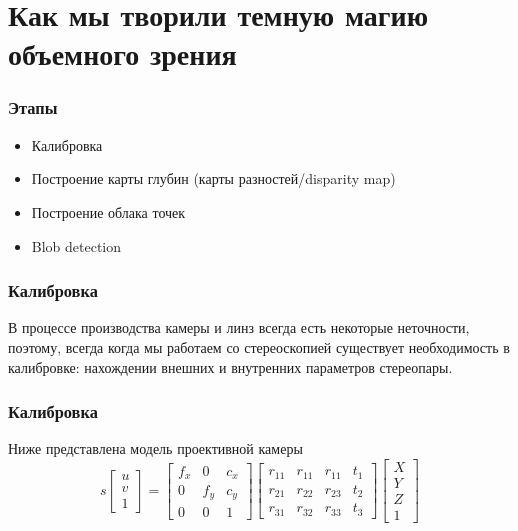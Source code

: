\documentclass{beamer}
\begin{document}
	\section{Как мы творили темную магию объемного зрения}
		\begin{frame}
			\frametitle{Этапы}
			
			\begin{itemize}
				\item Калибровка
				\item Построение карты глубин (карты разностей/disparity map)
				\item Построение облака точек
				\item Blob detection
			\end{itemize}
		\end{frame}
		
		\begin{frame}
			\frametitle{Калибровка}
			В процессе производства камеры и линз всегда есть некоторые неточности, поэтому, всегда когда мы работаем со стереоскопией существует необходимость в калибровке: нахождении внешних и внутренних параметров стереопары.
		\end{frame}

		\begin{frame}
			\frametitle{Калибровка}
			Ниже представлена модель проективной камеры
			\begin{equation}
			s
			\begin{bmatrix}
			u\\v\\1
			\end{bmatrix}
			=
			\begin{bmatrix}
			f_{x}&0&c_{x}\\
			0&f_{y}&c_{y}\\
			0&0&1
			\end{bmatrix}
			\begin{bmatrix}
			r_{11}&r_{11}&r_{11}&t_{1}\\
			r_{21}&r_{22}&r_{23}&t_{2}\\
			r_{31}&r_{32}&r_{33}&t_{3}
			\end{bmatrix}
			\begin{bmatrix}
			X\\Y\\Z\\1
			\end{bmatrix}
			\end{equation}
		\end{frame}
		
\end{document}
